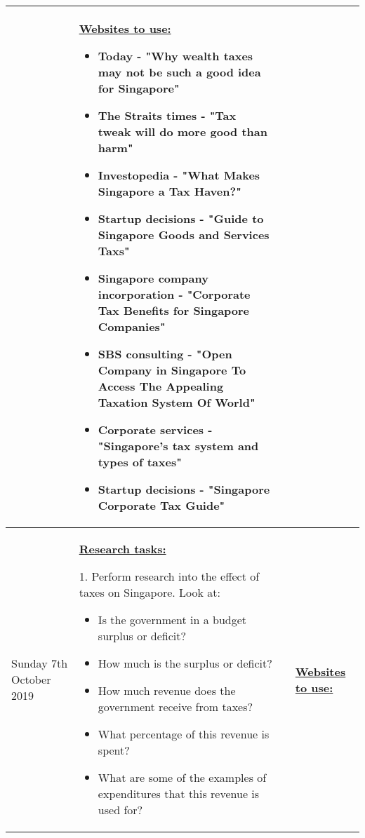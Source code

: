 \documentclass[12pt, a4paper]{article}
\newlength\combinedlength
\begin{document}
\begin{landscape}
\begin{longtable}{|m{5cm}|m{5cm}|m{5cm}|m{10.31cm}|}
{		}&
		
		
		\textbf{\underline{Websites to use:}}
		\newline
		
		\begin{itemize}
			\item Today - "Why wealth taxes may not be such a good idea for Singapore"
			\item The Straits times - "Tax tweak will do more good than harm"
			\item Investopedia - "What Makes Singapore a Tax Haven?"
			\item Startup decisions - "Guide to Singapore Goods and Services Taxs"
			\item Singapore company incorporation - "Corporate Tax Benefits for Singapore Companies"
			\item SBS consulting - "Open Company in Singapore To Access The Appealing Taxation System Of World"
			\item Corporate services - "Singapore's tax system and types of taxes"
			\item Startup decisions - "Singapore Corporate Tax Guide"
		\end{itemize}
		
		\\
		\hline

		
			Sunday 7th October 2019 & \multicolumn{2}{|m{\combinedlength}|}{	
			
			\textbf{\underline{Research tasks:}}
			\newline
			
			1. Perform research into the effect of taxes on Singapore. Look at:
			
			\begin{itemize}
				\item Is the government in a budget surplus or deficit?
				\item How much is the surplus or deficit?
				\item How much revenue does the government receive from taxes?
				\item What percentage of this revenue is spent?
				\item What are some of the examples of expenditures that this revenue is used for?
			\end{itemize}
			
		}&
		
		
		\textbf{\underline{Websites to use:}}
		\newline
		

\end{longtable}
\end{landscape}
\end{document}
